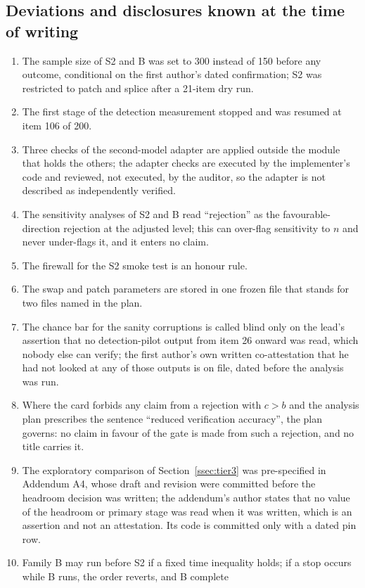 \subsection{Deviations and disclosures known at the time of writing}\label{app:deviations}
\begin{enumerate}
\item The sample size of S2 and B was set to 300 instead of 150 before any outcome, conditional on the first author's dated
confirmation; S2 was restricted to patch and splice after a 21-item dry run.
\item The first stage of the detection measurement stopped and was resumed at item 106 of 200.
\item Three checks of the second-model adapter are applied outside the module that holds the others; the adapter checks are executed
by the implementer's code and reviewed, not executed, by the auditor, so the adapter is not described as independently verified.
\item The sensitivity analyses of S2 and B read ``rejection'' as the favourable-direction rejection at the adjusted level; this can
over-flag sensitivity to $n$ and never under-flags it, and it enters no claim.
\item The firewall for the S2 smoke test is an honour rule.
\item The swap and patch parameters are stored in one frozen file that stands for two files named in the plan.
\item The chance bar for the sanity corruptions is called blind only on the lead's assertion that no detection-pilot output from item
26 onward was read, which nobody else can verify; the first author's own written co-attestation that he had not looked at any of those outputs is on file, dated before the analysis was run.
\item Where the card forbids any claim from a rejection with $c>b$ and the analysis plan prescribes the sentence ``reduced
verification accuracy'', the plan governs: no claim in favour of the gate is made from such a rejection, and no title carries it.
\item The exploratory comparison of Section~\ref{ssec:tier3} was pre-specified in Addendum A4, whose draft and revision were
committed before the headroom decision was written; the addendum's author states that no value of the headroom or primary stage was
read when it was written, which is an assertion and not an attestation.
Its code is committed only with a dated pin row.
\item Family B may run before S2 if a fixed time inequality holds; if a stop occurs while B runs, the order reverts, and B complete

\end{enumerate}
